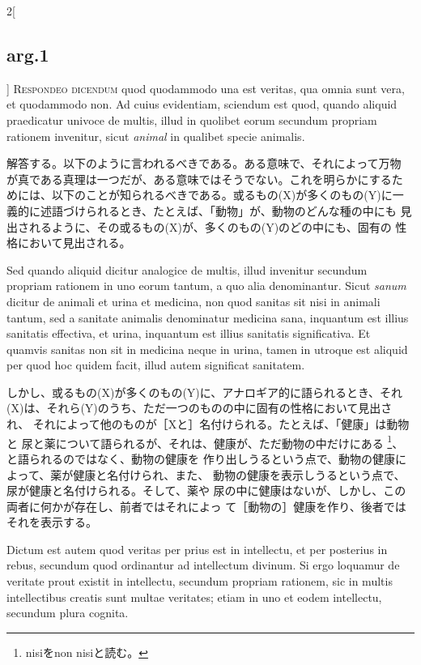 \documentclass[paper=a4paper,fontsize=10pt,jafontsize=9pt,titlepage]{jlreq}
\begin{document}
\begin{paracol}{2}[\subsection{arg.1}]
{\scshape Respondeo dicendum} quod quodammodo una est veritas, qua
omnia sunt vera, et quodammodo non. Ad cuius evidentiam, sciendum est
quod, quando aliquid praedicatur univoce de multis, illud in quolibet
eorum secundum propriam rationem invenitur, sicut {\itshape animal} in
qualibet specie animalis.

\switchcolumn

解答する。以下のように言われるべきである。ある意味で、それによって万物
が真である真理は一つだが、ある意味ではそうでない。これを明らかにするた
めには、以下のことが知られるべきである。或るもの(X)が多くのもの(Y)に一
義的に述語づけられるとき、たとえば、「動物」が、動物のどんな種の中にも
見出されるように、その或るもの(X)が、多くのもの(Y)のどの中にも、固有の
性格において見出される。

\switchcolumn*


Sed quando aliquid dicitur analogice de multis, illud invenitur
secundum propriam rationem in uno eorum tantum, a quo alia
denominantur. Sicut {\itshape sanum} dicitur de animali et urina et
medicina, non quod sanitas sit nisi in animali tantum, sed a sanitate
animalis denominatur medicina sana, inquantum est illius sanitatis
effectiva, et urina, inquantum est illius sanitatis significativa. Et
quamvis sanitas non sit in medicina neque in urina, tamen in utroque
est aliquid per quod hoc quidem facit, illud autem significat
sanitatem.

\switchcolumn

しかし、或るもの(X)が多くのもの(Y)に、アナロギア的に語られるとき、それ
(X)は、それら(Y)のうち、ただ一つのものの中に固有の性格において見出され、
それによって他のものが［Xと］名付けられる。たとえば、「健康」は動物と
尿と薬について語られるが、それは、健康が、ただ動物の中だけにある
\footnote{nisiをnon nisiと読む。}、と語られるのではなく、動物の健康を
作り出しうるという点で、動物の健康によって、薬が健康と名付けられ、また、
動物の健康を表示しうるという点で、尿が健康と名付けられる。そして、薬や
尿の中に健康はないが、しかし、この両者に何かが存在し、前者ではそれによっ
て［動物の］健康を作り、後者ではそれを表示する。

\switchcolumn*


Dictum est autem quod veritas per prius est in intellectu, et per
posterius in rebus, secundum quod ordinantur ad intellectum
divinum. Si ergo loquamur de veritate prout existit in intellectu,
secundum propriam rationem, sic in multis intellectibus creatis sunt
multae veritates; etiam in uno et eodem intellectu, secundum plura
cognita.


\end{paracol}
\end{document}
